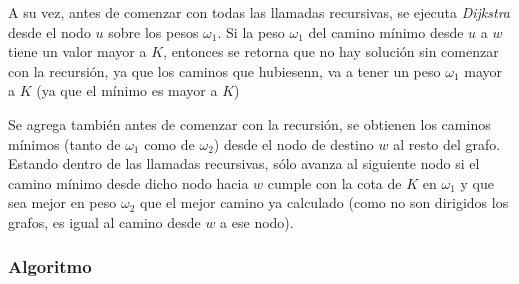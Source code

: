 A su vez, antes de comenzar con todas las llamadas recursivas, se ejecuta \emph{Dijkstra} desde el nodo $u$ sobre los pesos $\omega_1$. Si la peso $\omega_1$ del camino m\'inimo desde $u$ a $w$ tiene un valor mayor a $K$, entonces se retorna que no hay soluci\'on sin comenzar con la recursi\'on, ya que los caminos que hubiesenn, va a tener un peso $\omega_1$ mayor a $K$ (ya que el m\'inimo es mayor a $K$)

Se agrega tambi\'en antes de comenzar con la recursi\'on, se obtienen los caminos m\'inimos (tanto de $\omega_1$ como de $\omega_2$) desde el nodo de destino $w$ al resto del grafo.
Estando dentro de las llamadas recursivas, s\'olo avanza al siguiente nodo si el camino m\'inimo desde dicho nodo hacia $w$ cumple con la cota de $K$ en $\omega_1$ y que sea mejor en peso $\omega_2$ que el mejor camino ya calculado (como no son dirigidos los grafos, es igual al camino desde $w$ a ese nodo).

\subsubsection{Algoritmo}

